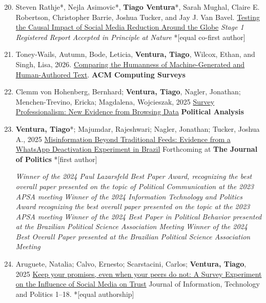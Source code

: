 \documentclass[letterpaper, 11pt]{article}
\newenvironment{benumerate}[1]{
    \let\oldItem\item
    \def\item{\addtocounter{enumi}{-2}\oldItem}
    \begin{enumerate}[leftmargin=2em]
    \setcounter{enumi}{#1}
    \addtocounter{enumi}{1}
}{
    \end{enumerate}
}
\begin{document}
     \begin{benumerate}{19}

    \item Steven Rathje*, Nejla Asimovic*, \textbf{Tiago Ventura}*,  Sarah Mughal, Claire E. Robertson, Christopher Barrie, Joshua Tucker, and Jay J. Van Bavel. \href{https://osf.io/preprints/psyarxiv/ujtxa_v1}{Testing the Causal Impact of Social Media Reduction Around the Globe} \textit{Stage 1 Registered Report Accepted in Principle at Nature} *[equal co-first author]

      \item Toney-Wails, Autumn, Bode, Leticia, \textbf{Ventura, Tiago}, Wilcox, Ethan, and Singh, Lisa, 2026. \href{https://dl.acm.org/doi/10.1145/3806206}{Comparing the Humanness of Machine-Generated and Human-Authored Text}. \textbf{ACM Computing Surveys}

      \item  Clemm von Hohenberg, Bernhard; \textbf{Ventura, Tiago}, Nagler, Jonathan; Menchen-Trevino, Ericka; Magdalena, Wojcieszak, 2025 \href{https://www.cambridge.org/core/journals/political-analysis/article/survey-professionalism-new-evidence-from-web-browsing-data/552625B9C6C5F32BA1DD69435043C184}{Survey Professionalism: New Evidence from Browsing Data} \textbf{Political Analysis}

        \item \textbf{Ventura, Tiago}*; Majumdar, Rajeshwari; Nagler, Jonathan; Tucker, Joshua A., 2025 \href{https://www.journals.uchicago.edu/doi/epdf/10.1086/737172}{Misinformation Beyond Traditional Feeds: Evidence from a WhatsApp Deactivation Experiment in Brazil} Forthcoming at  \textbf{The Journal of Politics} *[first author]

        \subitem \textit{Winner of the 2024 Paul Lazarsfeld Best Paper Award, recognizing the best overall paper presented on the topic of Political Communication at the 2023 APSA meeting}
        \subitem  \textit{Winner of the 2024 Information Technology and Politics Award recognizing the best overall paper presented on the topic at the 2023 APSA meeting}
       \subitem \textit{Winner of the 2024 Best Paper in Political Behavior presented at the Brazilian Political Science Association Meeting}
       \subitem \textit{Winner of the 2024 Best Overall Paper presented at the Brazilian Political Science Association Meeting}

       \item  Aruguete, Natalia; Calvo, Ernesto; Scarstacini, Carlos; \textbf{Ventura, Tiago}, 2025 \href{https://www.tandfonline.com/doi/full/10.1080/19331681.2025.2502503}{Keep your promises, even when your peers do not: A Survey Experiment on the Influence of Social Media on Trust}
       Journal of Information, Technology and Politics 1–18. *[equal authorship]



\end{benumerate}
\end{document}
